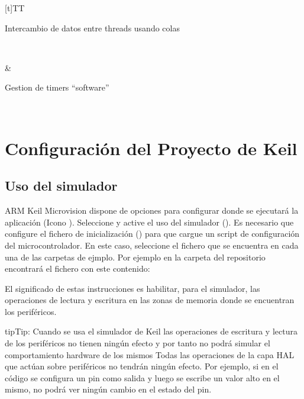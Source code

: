 \documentclass[letterpaper,10pt,english]{sphinxmanual}
\begin{document}
\begin{savenotes}
\begin{tabulary}{\linewidth}[t]{TT}
\begin{varwidth}[t]{}
Intercambio de datos entre threads usando colas
\sphinxbeforeendvarwidth
\end{varwidth}%
\\
\sphinxhline\begin{varwidth}[t]{}
\sphinxAtStartPar
{}
\sphinxbeforeendvarwidth
\end{varwidth}%
&\begin{varwidth}[t]{}
\sphinxAtStartPar
Gestion de timers “software”
\sphinxbeforeendvarwidth
\end{varwidth}%
\\
\sphinxbottomrule
\end{tabulary}
\sphinxtableafterendhook\par
\sphinxattableend\end{savenotes}


\section{Configuración del Proyecto de Keil}
\label{\detokenize{cmsis-rtos:configuracion-del-proyecto-de-keil}}

\subsection{Uso del simulador}
\label{\detokenize{cmsis-rtos:uso-del-simulador}}
\sphinxAtStartPar
ARM Keil Microvision dispone de opciones para configurar donde se ejecutará la aplicación (Icono ). Seleccione  y active el uso del simulador ().
Es necesario que configure el fichero de inicialización () para que cargue un script de configuración del microcontrolador. En este caso, seleccione el fichero  que se encuentra en cada una de las carpetas de ejmplo. Por ejemplo en la carpeta  del repositorio encontrará el fichero  con este contenido:

\sphinxAtStartPar
El significado de estas instrucciones es habilitar, para el simulador, las operaciones de lectura y escritura en las zonas de memoria donde se encuentran los periféricos.

\begin{sphinxadmonition}{tip}{Tip:}
\sphinxAtStartPar
Cuando se usa el simulador de Keil las operaciones de escritura y lectura de los periféricos no tienen ningún efecto y por tanto no podrá simular el comportamiento hardware de los mismos
Todas las operaciones de la capa HAL que actúan sobre periféricos no tendrán ningún efecto. Por ejemplo, si en el código se configura un pin como salida y luego se escribe un valor alto en el mismo, no podrá ver ningún cambio en el estado del pin.
\end{sphinxadmonition}
\end{document}
